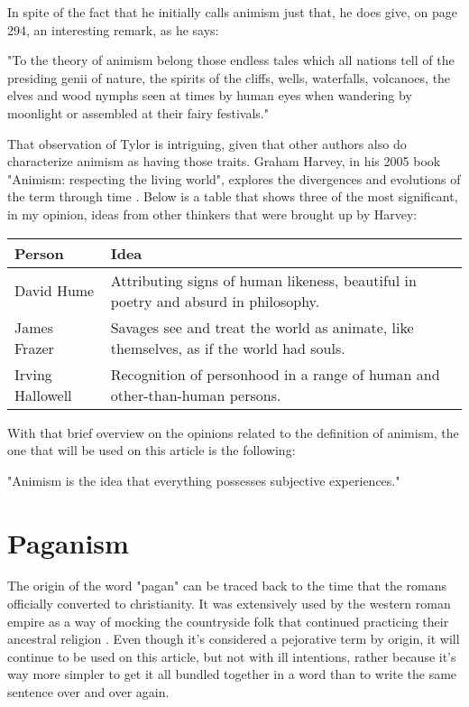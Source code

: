 In spite of the fact that he initially calls animism just that, he does give, on page 294, an interesting
remark, as he says:

\begin{center}
    \itshape
    \parbox{0.7\textwidth}{
    "To the theory of animism belong those endless tales which all nations tell of the presiding genii
    of nature, the spirits of the cliffs, wells, waterfalls, volcanoes, the elves and wood nymphs seen
    at times by human eyes when wandering by moonlight or assembled at their fairy festivals." 
    }
\end{center}

That observation of Tylor is intriguing, given that other authors also do characterize animism
as having those traits. Graham Harvey, in his 2005 book "Animism: respecting the living world", explores
the divergences and evolutions of the term through time \cite{Harvey2005}. Below is a table that shows
three of the most significant, in my opinion, ideas from other thinkers that were brought up by Harvey:

\begin{center}
    \begin{tabularx}{\textwidth}{||>{\raggedright\arraybackslash}X|>{\raggedleft\arraybackslash}X||} 
     \hline
     Person & Idea \\ [0.5ex] 
     \hline\hline
     David Hume & Attributing signs of human likeness, beautiful in poetry and absurd in philosophy. \\ 
     \hline
     James Frazer & Savages see and treat the world as animate, like themselves, as if the world had souls.\\
     \hline
     Irving Hallowell & Recognition of personhood in a range of human and other-than-human persons. \\ [1ex]
     \hline
    \end{tabularx}
\end{center}

With that brief overview on the opinions related to the definition of animism, the one that will be used
on this article is the following:

\begin{center}
    \itshape
    \parbox{0.7\textwidth}{
    "Animism is the idea that everything possesses subjective experiences." 
    }
\end{center}

\section{Paganism}
The origin of the word "pagan" can be traced back to the time that the romans officially converted to
christianity. It was extensively used by the western roman empire as a way of mocking the countryside
folk that continued practicing their ancestral religion \cite{Bowersock1999}. Even though it's considered
a pejorative term by origin, it will continue to be used on this article, but not with ill
intentions, rather because it's way more simpler to get it all bundled together in a word than to
write the same sentence over and over again.

